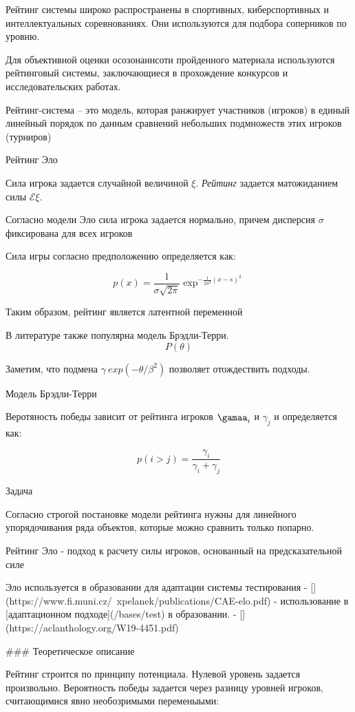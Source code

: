 Рейтинг системы широко распространены в спортивных, киберспортивных и интеллектуальных соревнованиях.
Они используются для подбора соперников по уровню.

Для объективной оценки осозонаннсоти пройденного материала используются рейтинговый системы, заключающиеся в прохождение конкурсов и исследовательских работах.

Рейтинг-система – это модель, которая ранжирует
участников (игроков) в единый линейный порядок по
данным сравнений небольших подмножеств этих игроков
(турниров)

Рейтинг Эло

Сила игрока задается случайной величиной $\xi$. \textit{Рейтинг} задается матожиданием силы $\mathcal{E} \xi$.

Согласно модели Эло сила игрока задается нормально, причем дисперсия $\sigma$ фиксирована для всех игроков

Сила игры согласно предположению определяется как:

$$
    p(x) = \frac{1}{\sigma \sqrt{2\pi}} \exp^{- \frac{1}{2\sigma^2}{(x-s)^2}}
$$

Таким образом, рейтинг является латентной переменной

В литературе также популярна модель Брэдли-Терри.
$$
    P(\theta)
$$

Заметим, что подмена $\gamma ~ exp(-\theta/\beta^2)$ позволяет отождествить подходы.




Модель Брэдли-Терри

Веротяность победы зависит от рейтинга игроков $\gamaa_i$ и $\gamma_j$ и определяется как:

$$
    p(i > j) = \frac{\gamma_i}{\gamma_i+\gamma_j}
$$

Задача


Согласно строгой постановке модели рейтинга нужны для линейного упорядочивания ряда объектов, которые можно сравнить только попарно.

\textit{}

Рейтинг Эло - подход к расчету силы игроков, основанный на предсказательной силе

Эло используется в образовании для адаптации системы тестирования \cite{}
- [](https://www.fi.muni.cz/~xpelanek/publications/CAE-elo.pdf) - использование в [адаптационном подходе](/bases/test) в образовании. 
- [](https://aclanthology.org/W19-4451.pdf)


### Теоретическое описание

Рейтинг строится по принципу потенциала. Нулевой уровень задается произвольно. Вероятность победы задается через разницу уровней игроков, считающимися явно необозримыми переменыыми:


